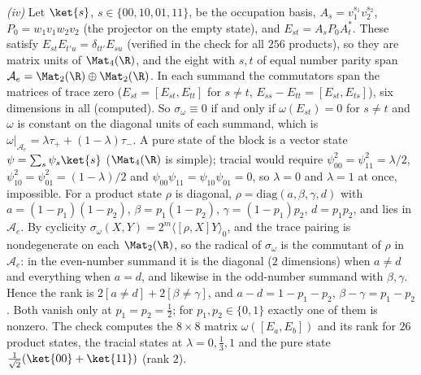 \emph{(iv)} Let $\ket{s}$, $s \in \{00, 10, 01, 11\}$, be the occupation basis, $A_{s} = v_{1}^{s_{1}}v_{2}^{s_{2}}$, $P_{0} = w_{1}v_{1}w_{2}v_{2}$ (the projector on the empty state), and $E_{st} = A_{s}P_{0}A_{t}^{*}$. These satisfy $E_{st}E_{t'u} = \delta_{tt'}E_{su}$ (verified in the check for all $256$ products), so they are matrix units of $\Mat_{4}(\R)$, and the eight with $s, t$ of equal number parity span $\mathcal{A}_{e} = \Mat_{2}(\R)\oplus\Mat_{2}(\R)$. In each summand the commutators span the matrices of trace zero ($E_{st} = [E_{st}, E_{tt}]$ for $s \ne t$, $E_{ss} - E_{tt} = [E_{st}, E_{ts}]$), six dimensions in all (computed). So $\sigma_{\omega} \equiv 0$ if and only if $\omega(E_{st}) = 0$ for $s \ne t$ and $\omega$ is constant on the diagonal units of each summand, which is $\omega|_{\mathcal{A}_{e}} = \lambda\tau_{+} + (1 - \lambda)\tau_{-}$. A pure state of the block is a vector state $\psi = \sum_{s}\psi_{s}\ket{s}$ ($\Mat_{4}(\R)$ is simple); tracial would require $\psi_{00}^{2} = \psi_{11}^{2} = \lambda/2$, $\psi_{10}^{2} = \psi_{01}^{2} = (1 - \lambda)/2$ and $\psi_{00}\psi_{11} = \psi_{10}\psi_{01} = 0$, so $\lambda = 0$ and $\lambda = 1$ at once, impossible. For a product state $\rho$ is diagonal, $\rho = \mathrm{diag}(a, \beta, \gamma, d)$ with $a = (1 - p_{1})(1 - p_{2})$, $\beta = p_{1}(1 - p_{2})$, $\gamma = (1 - p_{1})p_{2}$, $d = p_{1}p_{2}$, and lies in $\mathcal{A}_{e}$. By cyclicity $\sigma_{\omega}(X, Y) = 2^{m}\langle[\rho, X]Y\rangle_{0}$, and the trace pairing is nondegenerate on each $\Mat_{2}(\R)$, so the radical of $\sigma_{\omega}$ is the commutant of $\rho$ in $\mathcal{A}_{e}$: in the even-number summand it is the diagonal ($2$ dimensions) when $a \ne d$ and everything when $a = d$, and likewise in the odd-number summand with $\beta, \gamma$. Hence the rank is $2[a \ne d] + 2[\beta \ne \gamma]$, and $a - d = 1 - p_{1} - p_{2}$, $\beta - \gamma = p_{1} - p_{2}$. Both vanish only at $p_{1} = p_{2} = \tfrac12$; for $p_{1}, p_{2} \in \{0, 1\}$ exactly one of them is nonzero. The check computes the $8 \times 8$ matrix $\omega([E_{a}, E_{b}])$ and its rank for $26$ product states, the tracial states at $\lambda = 0, \tfrac13, 1$ and the pure state $\tfrac{1}{\sqrt2}(\ket{00} + \ket{11})$ (rank $2$).

